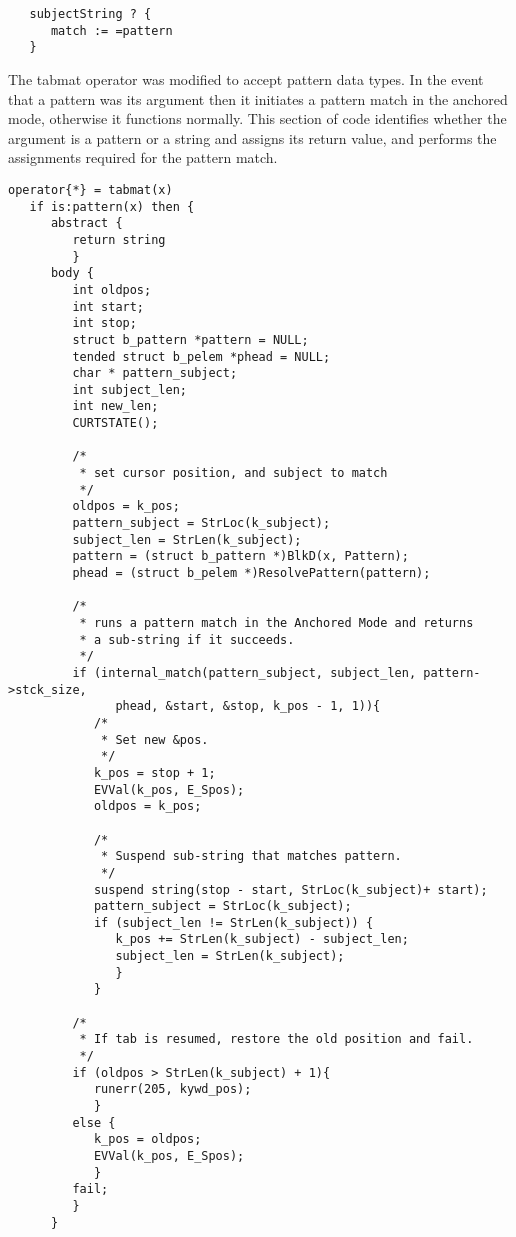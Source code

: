 \documentclass{article}
\begin{document}
\begin{verbatim}
   subjectString ? {
      match := =pattern
   }
\end{verbatim}

The tabmat operator was modified to accept pattern data types.  In the event that a pattern was its argument then it initiates a pattern match in the anchored mode, otherwise it functions normally.  This section of code identifies whether the argument is a pattern or a string and assigns its return value, and performs the assignments required for the pattern match.

\begin{verbatim}
operator{*} = tabmat(x)
   if is:pattern(x) then {
      abstract {
         return string
         }
      body {
         int oldpos;
         int start;
         int stop;
         struct b_pattern *pattern = NULL;
         tended struct b_pelem *phead = NULL; 
         char * pattern_subject;
         int subject_len;
         int new_len;
         CURTSTATE();
         
         /*
          * set cursor position, and subject to match
          */
         oldpos = k_pos;
         pattern_subject = StrLoc(k_subject);
         subject_len = StrLen(k_subject);
         pattern = (struct b_pattern *)BlkD(x, Pattern);
         phead = (struct b_pelem *)ResolvePattern(pattern);
         
         /*
          * runs a pattern match in the Anchored Mode and returns
          * a sub-string if it succeeds.
          */
         if (internal_match(pattern_subject, subject_len, pattern->stck_size,
               phead, &start, &stop, k_pos - 1, 1)){
            /*
             * Set new &pos.
             */ 
            k_pos = stop + 1;
            EVVal(k_pos, E_Spos);	
            oldpos = k_pos;
         
            /*
             * Suspend sub-string that matches pattern.
             */
            suspend string(stop - start, StrLoc(k_subject)+ start);
            pattern_subject = StrLoc(k_subject);
            if (subject_len != StrLen(k_subject)) {
               k_pos += StrLen(k_subject) - subject_len;
               subject_len = StrLen(k_subject);
               }
            }
            
         /*
          * If tab is resumed, restore the old position and fail.
          */
         if (oldpos > StrLen(k_subject) + 1){
            runerr(205, kywd_pos);
            } 
         else {
            k_pos = oldpos;
            EVVal(k_pos, E_Spos);
            }
         fail;
         }
      }
\end{verbatim}
\end{document}
